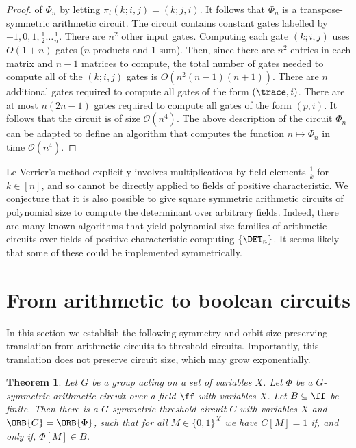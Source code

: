 \documentclass[11pt]{article}
\newtheorem{theorem}{Theorem}[section]
\begin{document}
\begin{proof}
  of $\Phi_n$ by letting $\pi_t (k;i,j) = (k;j,i)$. It follows that $\Phi_n$ is
  a transpose-symmetric arithmetic circuit.
  The circuit contains constant gates labelled by $-1, 0, 1, \frac{1}{2} \ldots
  \frac{1}{n}$.  There are $n^2$ other input gates. Computing each gate $(k; i, j)$ uses $O(1+n)$ gates ($n$ products and $1$ sum). Then, since there are $n^2$ entries in each matrix and $n-1$ matrices to compute, the total number of gates needed to compute all of the $(k;i,j)$ gates is $O(n^2 (n-1) (n+1))$. There are $n$ additional gates required to compute all gates of the form $(\trace,
  i)$.  There are at most $n (2n -1)$  gates required to compute all
  gates of the form $(p, i)$. It follows that the circuit is of size
  $\mathcal{O}(n^4)$. The above description of the circuit $\Phi_n$ can be
  adapted to define an algorithm that computes the function $n \mapsto \Phi_n$
  in time $\mathcal{O}(n^4)$.
\end{proof}
Le Verrier's method explicitly involves multiplications by field elements
$\frac{1}{k}$ for $k \in [n]$, and so cannot be directly applied to fields of
positive characteristic. We conjecture that it is also possible to give square
symmetric arithmetic circuits of polynomial size to compute the determinant over
arbitrary fields. Indeed, there are many known algorithms that yield
polynomial-size families of arithmetic circuits over fields of positive
characteristic computing $\{\DET_n\}$. It seems likely that some of these could
be implemented symmetrically.
\section{From arithmetic to boolean circuits}\label{sec:formulas-to-circuits}
In this section we establish the following symmetry and orbit-size preserving translation from
arithmetic circuits to threshold circuits. Importantly, this translation does not preserve circuit size, which may grow exponentially.

\begin{theorem}
  Let $G$ be a group acting on a set of variables $X$. Let $\Phi$ be a
  $G$-symmetric arithmetic circuit over a field $\ff$ with variables $X$. Let $B
  \subseteq \ff$ be finite. Then there is a $G$-symmetric threshold circuit $C$
  with variables $X$ and $\ORB{C} = \ORB{\Phi}$, such that for all $M \in \{0, 1\}^X$ we have $C[M] = 1$
  if, and only if, $\Phi[M] \in B$.
  \label{thm:arithmetic-to-boolean}
\end{theorem}
\end{document}
